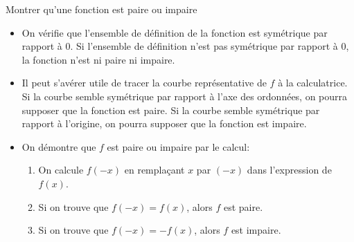 \documentclass[10pt,a4paper,openany,twoside,prof]{book}
\begin{document}
	\begin{methode}{Montrer qu'une fonction est paire ou impaire}{}
		\begin{itemize}
		\item On vérifie que l'ensemble de définition de la fonction est symétrique par rapport à 0. Si l'ensemble de définition n'est pas symétrique par rapport à 0, la fonction n'est ni paire ni impaire.

		\item Il peut s'avérer utile de tracer la courbe représentative de $f$ à la calculatrice.
		Si la courbe semble symétrique par rapport à l'axe des ordonnées, on pourra supposer que la fonction est paire.
		Si la courbe semble symétrique par rapport à l'origine, on pourra supposer que la fonction est impaire.

		\item On démontre que $f$ est paire ou impaire par le calcul:
		\begin{enumerate}
		\item On calcule $f\left(-x\right)$ en remplaçant $x$ par $\left(-x\right)$ dans l'expression de $f\left(x\right)$.
		\item Si on trouve que $f\left(-x\right)=f\left(x\right)$, alors $f$ est paire.
		\item Si on trouve que $f\left(-x\right)=-f\left(x\right)$, alors $f$ est impaire.
		\end{enumerate}
		\end{itemize}
		\end{methode}
\end{document}
